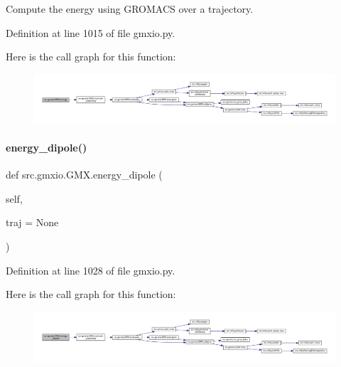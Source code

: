 Compute the energy using G\+R\+O\+M\+A\+CS over a trajectory. 



Definition at line 1015 of file gmxio.\+py.

Here is the call graph for this function\+:
\nopagebreak
\begin{figure}[H]
\begin{center}
\leavevmode
\includegraphics[width=350pt]{classsrc_1_1gmxio_1_1GMX_ab777a6e6ad8f1cfb8b7d3f5ced60838e_cgraph}
\end{center}
\end{figure}
\mbox{\label{classsrc_1_1gmxio_1_1GMX_a19fc55e4c5bc5d3bf300070cdb1a49a7}} 
\paragraph{\texorpdfstring{energy\+\_\+dipole()}{energy\_dipole()}}
{\footnotesize\ttfamily def src.\+gmxio.\+G\+M\+X.\+energy\+\_\+dipole (\begin{DoxyParamCaption}\item[{}]{self,  }\item[{}]{traj = {\ttfamily None} }\end{DoxyParamCaption})}



Definition at line 1028 of file gmxio.\+py.

Here is the call graph for this function\+:
\nopagebreak
\begin{figure}[H]
\begin{center}
\leavevmode
\includegraphics[width=350pt]{classsrc_1_1gmxio_1_1GMX_a19fc55e4c5bc5d3bf300070cdb1a49a7_cgraph}
\end{center}
\end{figure}
\mbox{\label{classsrc_1_1gmxio_1_1GMX_afc3071aab6e7a737e0baada5f9b1f292}} 
